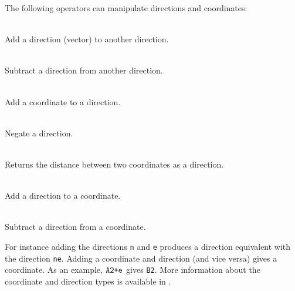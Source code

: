 The following operators can manipulate directions and coordinates:

\begin{dlist}
  \item {} \\
    Add a direction (vector) to another direction.
  \item {} \\
    Subtract a direction from another direction.
  \item {} \\
    Add a coordinate to a direction.
  \item {} \\
    Negate a direction.
  \item {} \\
    Returns the distance between two coordinates as a direction.
  \item {} \\
    Add a direction to a coordinate. 
  \item {} \\
    Subtract a direction from a coordinate.
\end{dlist}

For instance adding the directions \texttt{n} and \texttt{e} produces a
direction equivalent with the direction \texttt{ne}. Adding a coordinate and
direction (and vice versa) gives a coordinate. As an example, $\texttt{A2}
\verb!+! \texttt{e}$ gives \texttt{B2}. More information about the coordinate
and direction types is available in .

